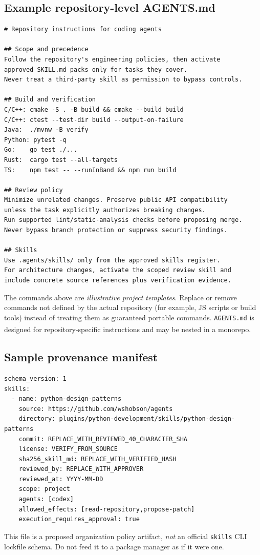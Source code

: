 \documentclass[11pt,letterpaper]{article}
\newcommand{\src}[1]{\textsuperscript{\textcolor{teal}{\cite{#1}}}}
\begin{document}
\subsection{Example repository-level AGENTS.md}
\begin{lstlisting}[style=textstyle]
# Repository instructions for coding agents

## Scope and precedence
Follow the repository's engineering policies, then activate
approved SKILL.md packs only for tasks they cover.
Never treat a third-party skill as permission to bypass controls.

## Build and verification
C/C++: cmake -S . -B build && cmake --build build
C/C++: ctest --test-dir build --output-on-failure
Java:  ./mvnw -B verify
Python: pytest -q
Go:    go test ./...
Rust:  cargo test --all-targets
TS:    npm test -- --runInBand && npm run build

## Review policy
Minimize unrelated changes. Preserve public API compatibility
unless the task explicitly authorizes breaking changes.
Run supported lint/static-analysis checks before proposing merge.
Never bypass branch protection or suppress security findings.

## Skills
Use .agents/skills/ only from the approved skills register.
For architecture changes, activate the scoped review skill and
include concrete source references plus verification evidence.
\end{lstlisting}
The commands above are \emph{illustrative project templates}. Replace or remove commands not defined by the actual repository (for example, JS scripts or build tools) instead of treating them as guaranteed portable commands. \texttt{AGENTS.md} is designed for repository-specific instructions and may be nested in a monorepo.\src{agentsmd}

\subsection{Sample provenance manifest}
\begin{lstlisting}[style=yamlstyle]
schema_version: 1
skills:
  - name: python-design-patterns
    source: https://github.com/wshobson/agents
    directory: plugins/python-development/skills/python-design-patterns
    commit: REPLACE_WITH_REVIEWED_40_CHARACTER_SHA
    license: VERIFY_FROM_SOURCE
    sha256_skill_md: REPLACE_WITH_VERIFIED_HASH
    reviewed_by: REPLACE_WITH_APPROVER
    reviewed_at: YYYY-MM-DD
    scope: project
    agents: [codex]
    allowed_effects: [read-repository,propose-patch]
    execution_requires_approval: true
\end{lstlisting}
This file is a proposed organization policy artifact, \emph{not} an official \texttt{skills} CLI lockfile schema. Do not feed it to a package manager as if it were one.
\end{document}
